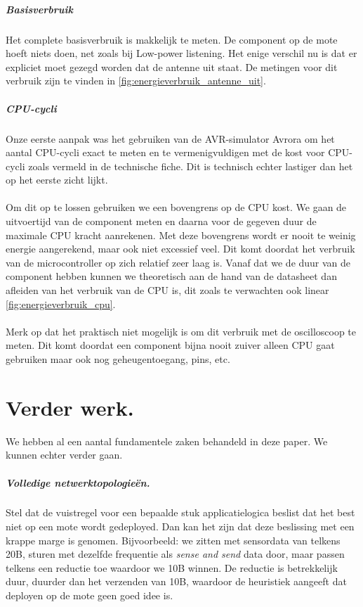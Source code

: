\documentclass{article}
\begin{document}
\subparagraph{Basisverbruik}

Het complete basisverbruik is makkelijk te meten. De component op de mote hoeft niets doen, net zoals bij Low-power listening. Het enige verschil nu is dat er expliciet moet gezegd worden dat de antenne uit staat.
De metingen voor dit verbruik zijn te vinden in \ref{fig:energieverbruik_antenne_uit}.

\subparagraph{CPU-cycli}

Onze eerste aanpak was het gebruiken van de AVR-simulator Avrora
\cite{titzer2005avrora} om het aantal CPU-cycli exact te meten en te
vermenigvuldigen met de kost voor CPU-cycli zoals vermeld in de technische
fiche. Dit is technisch echter lastiger dan het op het eerste zicht lijkt.
\\
\\
Om dit op te lossen gebruiken we een bovengrens op de CPU kost. We gaan de uitvoertijd van de component meten en daarna voor de gegeven duur de maximale CPU kracht aanrekenen. Met deze bovengrens wordt er nooit te weinig energie aangerekend, maar ook niet excessief veel. Dit komt doordat het verbruik van de microcontroller op zich relatief zeer laag is. Vanaf dat we de duur van de component hebben kunnen we theoretisch aan de hand van de datasheet dan afleiden van het verbruik van de CPU is, dit zoals te verwachten ook linear \ref{fig:energieverbruik_cpu}.\\
\\
Merk op dat het praktisch niet mogelijk is om dit verbruik met de oscilloscoop te meten.
Dit komt doordat een component bijna nooit zuiver alleen CPU gaat gebruiken maar ook nog geheugentoegang, pins, etc. 

\section{Verder werk.} 

We hebben al een aantal fundamentele zaken behandeld in deze paper. We kunnen
echter verder gaan.
 
\subparagraph{Volledige netwerktopologie\"en.}

Stel dat de vuistregel voor een bepaalde stuk applicatielogica beslist dat het
best niet op een mote wordt gedeployed. Dan kan het zijn dat deze beslissing met
een krappe marge is genomen. Bijvoorbeeld: we zitten met sensordata van telkens
20B, sturen met dezelfde frequentie als \textit{sense and send} data door, maar
passen telkens een reductie toe waardoor we 10B winnen. De reductie is
betrekkelijk duur, duurder dan het verzenden van 10B, waardoor de heuristiek
aangeeft dat deployen op de mote geen goed idee is. 
\end{document}
